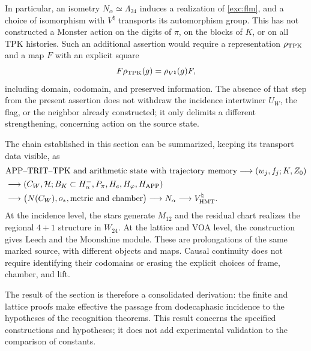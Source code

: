 \newpage
In particular, an isometry $N_\alpha\simeq\Lambda_{24}$ induces
a realization of \eqref{exc:flm}, and a choice of isomorphism
with $V^\natural$ transports its automorphism group. This has not
constructed a Monster action on the digits of
$\pi$, on the blocks of $K$, or on all TPK histories.
Such an additional assertion would require a representation
$\rho_{\rm TPK}$ and a map $F$ with an explicit square
\[
 F\rho_{\rm TPK}(g)=\rho_{V^\natural}(g)F,
\]
including domain, codomain, and preserved information. The absence
of that step from the present assertion does not withdraw the incidence
intertwiner $U_W$, the flag, or the neighbor already constructed; it only
delimits a different strengthening, concerning action on the source state.

The chain established in this section can be summarized, keeping
its transport data visible, as
\begin{align*}
 &\text{APP--TRIT--TPK and arithmetic state with trajectory memory}
   \longrightarrow (w_j,f_j;K,Z_0)\\
 &\longrightarrow (C_W,\mathcal H;B_K\subset H^-_\alpha,
                   P_\pi,H_e,H_\varphi,H_{\rm APP})\\
 &\longrightarrow \bigl(N(C_W),o_*,\text{metric and chamber}\bigr)
   \longrightarrow N_\alpha
   \longrightarrow V^\natural_{\rm HMT}.
\end{align*}
At the incidence level, the stars generate $M_{12}$ and the
residual chart realizes the regional $4+1$ structure in $W_{24}$.
At the lattice and VOA level, the construction gives Leech and the
Moonshine module. These are prolongations of the same marked source, with
different objects and maps. Causal continuity does not require
identifying their codomains or erasing the explicit choices
of frame, chamber, and lift.

The result of the section is therefore a consolidated derivation:
the finite and lattice proofs make effective the passage from
dodecaphasic incidence to the hypotheses of the recognition
theorems. This result concerns the specified constructions and
hypotheses; it does not add experimental validation to the
comparison of constants.
